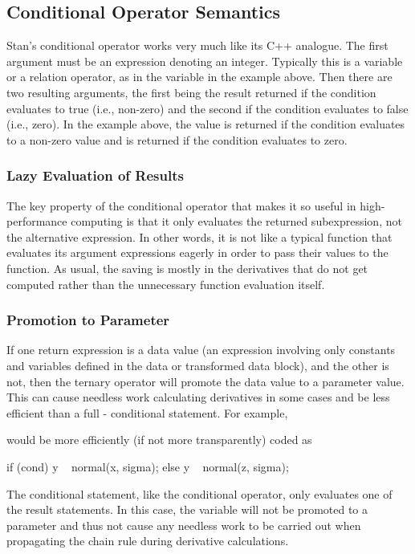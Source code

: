 \subsection{Conditional Operator Semantics}

Stan's conditional operator works very much like its C++ analogue.
The first argument must be an expression denoting an integer.
Typically this is a variable or a relation operator, as in the
variable  in the example above.  Then there are two resulting
arguments, the first being the result returned if the condition
evaluates to true (i.e., non-zero) and the second if the condition
evaluates to false (i.e., zero).  In the example above, the value
 is returned if the condition evaluates to a non-zero value
and  is returned if the condition evaluates to zero.

\subsubsection{Lazy Evaluation of Results}

The key property of the conditional operator that makes it so useful
in high-performance computing is that it only evaluates the returned
subexpression, not the alternative expression.  In other words, it is
not like a typical function that evaluates its argument expressions
eagerly in order to pass their values to the function.  As usual, the
saving is mostly in the derivatives that do not get computed rather
than the unnecessary function evaluation itself.

\subsubsection{Promotion to Parameter}

If one return expression is a data value (an expression involving only
constants and variables defined in the data or transformed data
block), and the other is not, then the ternary operator will promote
the data value to a parameter value.  This can cause needless work
calculating derivatives in some cases and be less efficient than a full
- conditional statement.  For example,
%
\begin{stancode}
data {
  real x[10];
  ...
parameters {
  real z[10];
  ...
model {
  y ~ normal(cond ? x : z, sigma);
  ...
\end{stancode}
%
would be more efficiently (if not more transparently) coded as
%
\begin{stancode}
if (cond)
  y ~ normal(x, sigma);
else
  y ~ normal(z, sigma);
\end{stancode}
%
The conditional statement, like the conditional operator, only
evaluates one of the result statements.  In this case, the variable
 will not be promoted to a parameter and thus not cause any
needless work to be carried out when propagating the chain rule during
derivative calculations.


